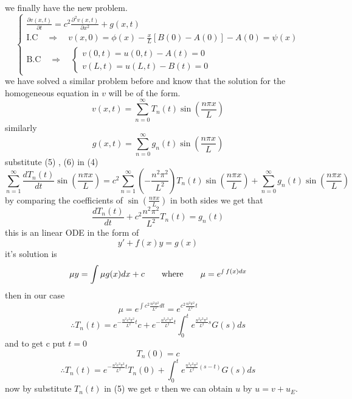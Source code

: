 \documentclass[]{article}
\begin{document}
we finally have the new problem.
\begin{equation}
    \begin{cases}
        \displaystyle \frac{\partial v(x,t)}{\partial t} = c^2 \frac{\partial^2 v(x,t)}{\partial x^2} + g(x,t)
        \\
        \text{I.C} \quad \Longrightarrow \quad v(x,0) = \phi(x) - \frac{x}{L}[B(0)-A(0)] -A(0)= \psi(x)
        \\
        \text{B.C} \quad \Longrightarrow \quad
            \begin{cases}
                v(0,t) = u(0,t) - A(t) = 0
                \\
                v(L,t)= u(L,t) - B(t) = 0        
            \end{cases}    
    \end{cases}
\end{equation}
we have solved a similar problem before and know that the solution for the homogeneous equation in $v$ will be of the form.
\begin{equation}
v(x,t) = \sum_{n=0}^{\infty} T_n (t) \sin\left(\frac{n\pi x}{L}\right)
\end{equation}
similarly 
\begin{equation}
    g(x,t) = \sum_{n=0}^{\infty} g_n (t) \sin\left(\frac{n\pi x}{L}\right)
\end{equation}
substitute (5) , (6) in (4)
\[
    \sum_{n=1}^{\infty} \frac{d T_n (t)}{dt}\sin\left(\frac{n\pi x}{L}\right) 
    = c^2 \sum_{n=1}^{\infty} \left(-\frac{n^2 \pi^2}{L^2}\right) T_n(t)\sin\left(\frac{n\pi x}{L}\right)
    + \sum_{n=0}^{\infty} g_n (t) \sin\left(\frac{n\pi x}{L}\right)
\]
by comparing the coefficients of $\displaystyle \sin\left(\frac{n\pi x}{L}\right)$ in both sides we get that 
\[
    \frac{d T_n (t)}{dt}+c^2\frac{n^2 \pi^2}{L^2} T_n(t)
    =g_n(t)
\]
this is an linear ODE in the form of 
\[
    y'+f(x)y = g(x)
\]
it's solution is 
\[
\mu y = \int \mu g(x) dx + c \quad\quad \text{where} \quad\quad \mu = e^{\smallint f(x) dx}
\]
then in our case
\[
\mu = e^{\int c^2\frac{n^2 \pi^2}{L^2} dt} = e^{c^2\frac{n^2 \pi^2}{L^2} t}
\]
\[
\therefore T_n(t) = e^{-\frac{n^2 c^2 \pi^2}{L^2}t}c + e^{-\frac{n^2 c^2 \pi^2}{L^2}t}\int_{0}^{t} e^{\frac{n^2 c^2 \pi^2}{L^2}s} G(s) ds
\]
and to get c put $t = 0$
\[
T_n(0) = c
\]
\[
  \therefore  T_n (t) = e^{-\frac{n^2 c^2 \pi^2}{L^2}t}T_n(0) +\int_{0}^{t} e^{\frac{n^2 c^2 \pi^2}{L^2}(s-t)} G(s) ds    
\]
now by substitute $T_n (t)$ in (5) we get $v$ then we can obtain $u$ by $u = v + u_E$.
\end{document}

